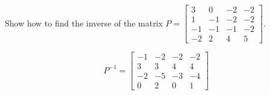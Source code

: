 
\begin{exerciseStatement}


Show how to find the inverse of the matrix \(P= \left[\begin{array}{cccc}
3 & 0 & -2 & -2 \\
1 & -1 & -2 & -2 \\
-1 & -1 & -1 & -2 \\
-2 & 2 & 4 & 5
\end{array}\right] \).


\end{exerciseStatement}
    
\begin{exerciseAnswer} 
\[P^{-1}= \left[\begin{array}{cccc}
-1 & -2 & -2 & -2 \\
3 & 3 & 4 & 4 \\
-2 & -5 & -3 & -4 \\
0 & 2 & 0 & 1
\end{array}\right] \]
\end{exerciseAnswer}
    
